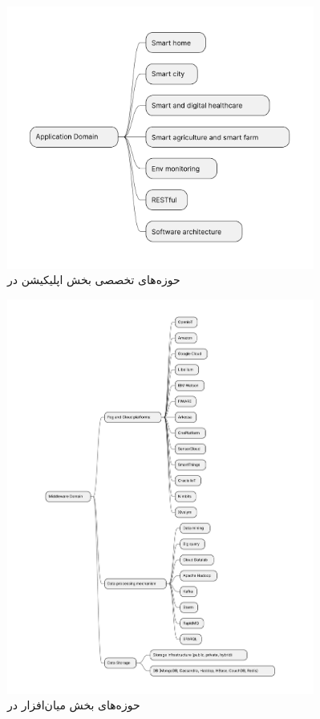 \begin{figure}[H]
  \centering
  \includegraphics[width=0.9\textwidth]{./figures/IoT_application_domains.pdf}
  \caption{حوزه‌های تخصصی بخش اپلیکیشن در }
  \label{fig:iotApplicationDomains}
\end{figure}

\begin{figure}[H]
  \centering
  \includegraphics[width=0.9\textwidth]{./figures/IoT_middleware_domains.pdf}
  \caption{حوزه‌های بخش میان‌افزار در }
  \label{fig:iotMiddlewareDomains}
\end{figure}

